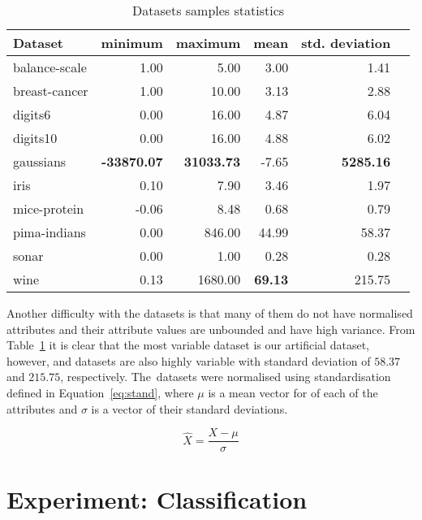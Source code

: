 \documentclass[12pt,a4paper]{report}
\begin{document}
\begin{table}[ht] \centering
\begin{tabular}{lrrrrr}
\hline
Dataset & minimum & maximum & mean & std. deviation \\
\hline
balance-scale           & 1.00  & 5.00    & 3.00  & 1.41 \\
breast-cancer           & 1.00  & 10.00   & 3.13  & 2.88 \\
digits6                 & 0.00  & 16.00   & 4.87  & 6.04 \\
digits10                & 0.00  & 16.00   & 4.88  & 6.02 \\
gaussians               & \textbf{-33870.07} & \textbf{31033.73} & -7.65 & \textbf{5285.16} \\
iris                    & 0.10  & 7.90    & 3.46  & 1.97 \\
mice-protein            & -0.06 & 8.48    & 0.68  & 0.79 \\
pima-indians            & 0.00  & 846.00  & 44.99 & 58.37 \\
sonar                   & 0.00  & 1.00    & 0.28  & 0.28 \\
wine                    & 0.13  & 1680.00 & \textbf{69.13} & 215.75 \\
\hline
\end{tabular}
\caption{Datasets samples statistics} \label{tab:datasets-samples}
\end{table}

Another difficulty with the datasets is that many of them do not have normalised attributes and their attribute values are unbounded and have high variance. From Table~\ref{tab:datasets-samples} it is clear that the most variable dataset is our artificial  dataset, however,  and  datasets are also highly variable with  standard deviation of $58.37$ and $215.75$, respectively. The~datasets were normalised using standardisation defined in Equation~\ref{eq:stand}, where $\mu$ is a mean vector for of each of the attributes and $\sigma$ is a vector of their standard deviations.

\begin{equation} \label{eq:stand}
\hat{X} = \frac{X-\mu}{\sigma}
\end{equation}

\section{Experiment: Classification} \label{chap:exp:classification}
\end{document}
